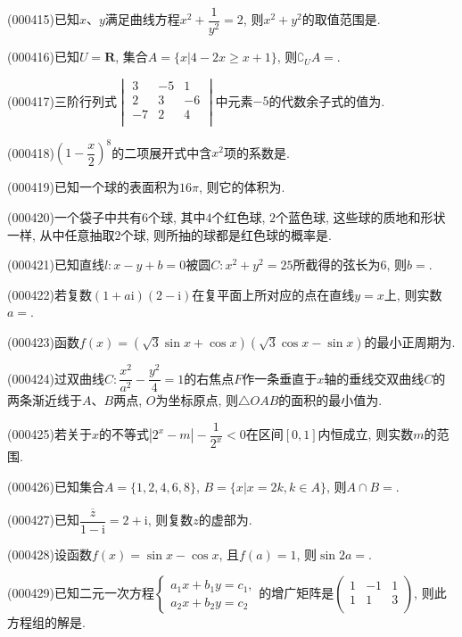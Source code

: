 \item (000415)已知$x$、$y$满足曲线方程$x^2+\dfrac1{y^2}=2$, 则$x^2+y^2$的取值范围是.
\item (000416)已知$U=\mathbf{R}$, 集合$A=\{x|4-2x\ge x+1\}$, 则${\complement_U}A=$.
\item (000417)三阶行列式$\begin{vmatrix}   3 & -5 & 1 \\   2 & 3 & -6 \\   -7 & 2 & 4 \\ \end{vmatrix}$中元素$-5$的代数余子式的值为.
\item (000418)$(1-\dfrac x2)^8$的二项展开式中含$x^2$项的系数是.
\item (000419)已知一个球的表面积为$16\pi$, 则它的体积为.
\item (000420)一个袋子中共有$6$个球, 其中$4$个红色球, $2$个蓝色球, 这些球的质地和形状一样, 从中任意抽取$2$个球, 则所抽的球都是红色球的概率是.
\item (000421)已知直线$l:x-y+b=0$被圆$C:x^2+y^2=25$所截得的弦长为$6$, 则$b=$.
\item (000422)若复数$(1+a\mathrm{i})(2-\mathrm{i})$在复平面上所对应的点在直线$y=x$上, 则实数$a=$.
\item (000423)函数$f(x)=(\sqrt3\sin x+\cos x)(\sqrt3\cos x-\sin x)$的最小正周期为.
\item (000424)过双曲线$C:\dfrac{x^2}{a^2}-\dfrac{y^2}4=1$的右焦点$F$作一条垂直于$x$轴的垂线交双曲线$C$的两条渐近线于$A$、$B$两点, $O$为坐标原点, 则$\triangle OAB$的面积的最小值为.
\item (000425)若关于$x$的不等式$|2^x-m|-\dfrac1{2^x}<0$在区间$[0,1]$内恒成立, 则实数$m$的范围.
\item (000426)已知集合$A=\{1,2,4,6,8\}$, $B=\{x|x=2k,k\in A\}$, 则$A\cap B=$.
\item (000427)已知$\dfrac{\overline z}{1-\mathrm{i}}=2+\mathrm{i}$, 则复数$z$的虚部为.
\item (000428)设函数$f(x)=\sin x-\cos x$, 且$f(a)=1$, 则$\sin 2a=$.
\item (000429)已知二元一次方程$\begin{cases} {a_1}x+{b_1}y={c_1}, \\  {a_2}x+{b_2}y={c_2} \end{cases}$的增广矩阵是$\begin{pmatrix} 1 & -1 & 1 \\  1 & 1 & 3 \\ \end{pmatrix}$, 则此方程组的解是.
